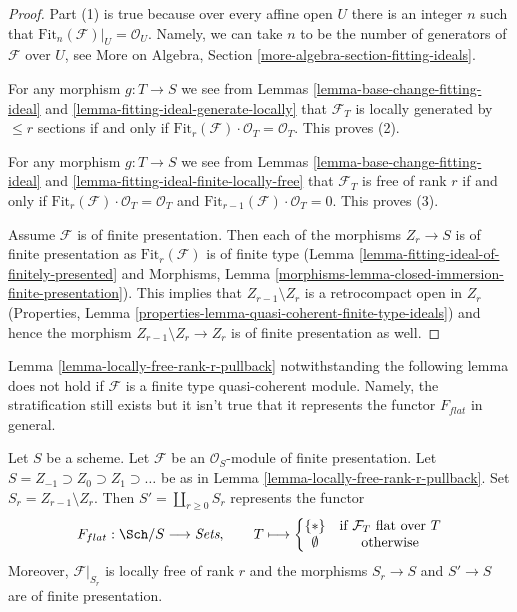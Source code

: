 \begin{proof}
Part (1) is true because over every affine open $U$ there is an integer $n$
such that $\text{Fit}_n(\mathcal{F})|_U = \mathcal{O}_U$. Namely, we can
take $n$ to be the number of generators of $\mathcal{F}$ over $U$, see
More on Algebra, Section \ref{more-algebra-section-fitting-ideals}.

\medskip\noindent
For any morphism $g : T \to S$ we see from
Lemmas \ref{lemma-base-change-fitting-ideal} and
\ref{lemma-fitting-ideal-generate-locally}
that $\mathcal{F}_T$ is locally generated by $\leq r$ sections if and only if
$\text{Fit}_r(\mathcal{F}) \cdot \mathcal{O}_T = \mathcal{O}_T$.
This proves (2).

\medskip\noindent
For any morphism $g : T \to S$ we see from
Lemmas \ref{lemma-base-change-fitting-ideal} and
\ref{lemma-fitting-ideal-finite-locally-free}
that $\mathcal{F}_T$ is free of rank $r$ if and only if
$\text{Fit}_r(\mathcal{F}) \cdot \mathcal{O}_T = \mathcal{O}_T$ and
$\text{Fit}_{r - 1}(\mathcal{F}) \cdot \mathcal{O}_T = 0$.
This proves (3).

\medskip\noindent
Assume $\mathcal{F}$ is of finite presentation. Then each of the morphisms
$Z_r \to S$ is of finite presentation as $\text{Fit}_r(\mathcal{F})$
is of finite type (Lemma \ref{lemma-fitting-ideal-of-finitely-presented} and
Morphisms, Lemma \ref{morphisms-lemma-closed-immersion-finite-presentation}).
This implies that $Z_{r - 1} \setminus Z_r$ is a retrocompact open in $Z_r$
(Properties, Lemma \ref{properties-lemma-quasi-coherent-finite-type-ideals})
and hence the morphism $Z_{r - 1} \setminus Z_r \to Z_r$
is of finite presentation as well.
\end{proof}

\noindent
Lemma \ref{lemma-locally-free-rank-r-pullback} notwithstanding
the following lemma does not hold if $\mathcal{F}$ is a finite type
quasi-coherent module. Namely, the stratification still exists but
it isn't true that it represents the functor $F_{flat}$ in general.

\begin{lemma}
\label{lemma-finite-presentation-module}
Let $S$ be a scheme. Let $\mathcal{F}$ be an $\mathcal{O}_S$-module
of finite presentation. Let $S = Z_{-1} \supset Z_0 \supset Z_1 \supset \ldots$
be as in Lemma \ref{lemma-locally-free-rank-r-pullback}.
Set $S_r = Z_{r - 1} \setminus Z_r$.
Then $S' = \coprod_{r \geq 0} S_r$ represents the functor
$$
F_{flat} : \Sch/S \longrightarrow \textit{Sets},\quad\quad
T \longmapsto
\left\{
\begin{matrix}
\{*\} & \text{if }\mathcal{F}_T\text{ flat over }T\\
\emptyset & \text{otherwise}
\end{matrix}
\right.
$$
Moreover, $\mathcal{F}|_{S_r}$ is locally free of rank $r$ and the
morphisms $S_r \to S$ and $S' \to S$ are of finite presentation.
\end{lemma}

